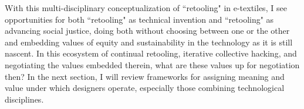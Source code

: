 

With this multi-disciplinary conceptualization of ``retooling" in e-textiles, I see opportunities for both ``retooling" as technical invention and ``retooling" as advancing social justice, doing both without choosing between one or the other and embedding values of equity and sustainability in the technology as it is still nascent. In this ecosystem of continual retooling, iterative collective hacking, and negotiating the values embedded therein, what are these values up for negotiation then? In the next section, I will review frameworks for assigning meaning and value under which designers operate, especially those combining technological disciplines.

